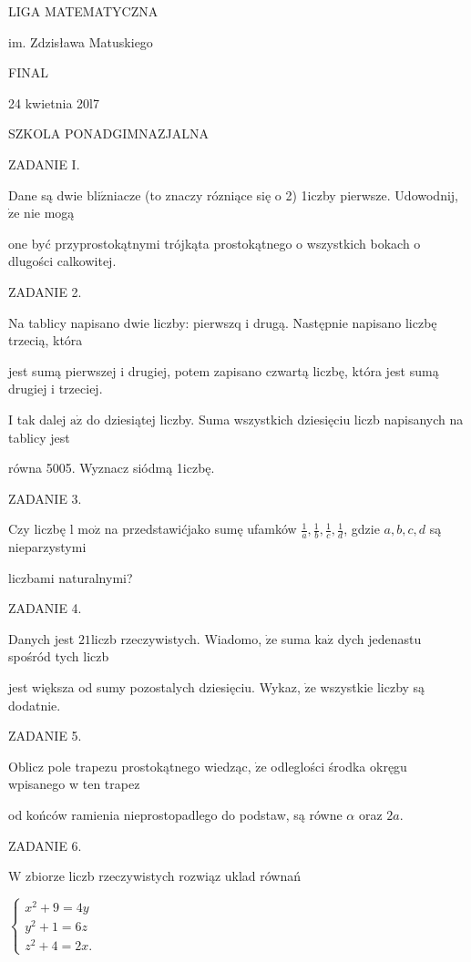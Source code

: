 \documentclass[a4paper,12pt]{article}
\begin{document}
LIGA MATEMATYCZNA

im. Zdzisława Matuskiego

FINAL

24 kwietnia 20l7

SZKOLA PONADGIMNAZJALNA

ZADANIE I.

Dane są dwie $\mathrm{b}\mathrm{l}\mathrm{i}\acute{\mathrm{z}}$niacze (to znaczy rózniące się o 2) 1iczby pierwsze. Udowodnij, $\dot{\mathrm{z}}\mathrm{e}$ nie mogą

one być przyprostokątnymi trójkąta prostokątnego o wszystkich bokach o dlugości calkowitej.

ZADANIE 2.

Na tablicy napisano dwie liczby: pierwszq i drugą. Następnie napisano liczbę trzecią, która

jest sumą pierwszej i drugiej, potem zapisano czwartą liczbę, która jest sumą drugiej i trzeciej.

I tak dalej $\mathrm{a}\dot{\mathrm{z}}$ do dziesiątej liczby. Suma wszystkich dziesięciu liczb napisanych na tablicy jest

równa 5005. Wyznacz siódmą 1iczbę.

ZADANIE 3.

Czy liczbę l $\mathrm{m}\mathrm{o}\dot{\mathrm{z}}$ na przedstawićjako sumę ufamków $\displaystyle \frac{1}{a}, \displaystyle \frac{1}{b}, \displaystyle \frac{1}{c}, \displaystyle \frac{1}{d}$, gdzie $a, b, c, d$ są nieparzystymi

liczbami naturalnymi?

ZADANIE 4.

Danych jest $21$liczb rzeczywistych. Wiadomo, $\dot{\mathrm{z}}\mathrm{e}$ suma $\mathrm{k}\mathrm{a}\dot{\mathrm{z}}$ dych jedenastu spośród tych liczb

jest większa od sumy pozostalych dziesięciu. Wykaz, $\dot{\mathrm{z}}\mathrm{e}$ wszystkie liczby są dodatnie.

ZADANIE 5.

Oblicz pole trapezu prostokątnego wiedząc, $\dot{\mathrm{z}}\mathrm{e}$ odleglości środka okręgu wpisanego w ten trapez

od końców ramienia nieprostopadlego do podstaw, są równe $\alpha$ oraz $2a.$

ZADANIE 6.

$\mathrm{W}$ zbiorze liczb rzeczywistych rozwiąz uklad równań

$\left\{\begin{array}{l}
x^{2}+9=4y\\
y^{2}+1=6z\\
z^{2}+4=2x.
\end{array}\right.$
\end{document}
